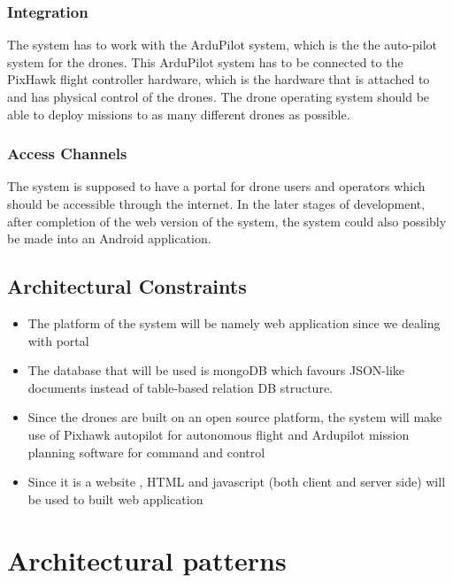 \documentclass{article}
\begin{document}
	\subsubsection{Integration}
	The system has to work with the ArduPilot system, which is the the auto-pilot system for the drones. This ArduPilot system has to be connected to the PixHawk flight controller hardware, which is the hardware that is attached to and has physical control of the drones. The drone operating system should be able to deploy missions to as many different drones as possible.
	\subsubsection{Access Channels}
	The system is supposed to have a portal for drone users and operators which should be accessible through the internet. In the later stages of development, after completion of the web version of the system, the system could also possibly be made into an Android application.
	\subsection{Architectural Constraints }%
	\begin{itemize}
		\item	The platform of the system will  be namely web application since we dealing with portal 
		\item	The database that will be used is mongoDB which favours JSON-like documents instead of table-based relation DB structure.
		\item 	Since the drones are built on an open source platform, the system will make use of Pixhawk autopilot for autonomous flight and Ardupilot mission planning software for command and control
		\item 	Since it is a website , HTML and javascript (both client and server side) will be used to built web application
	\end{itemize}
	
	\section{Architectural patterns}%
	
\end{document}
